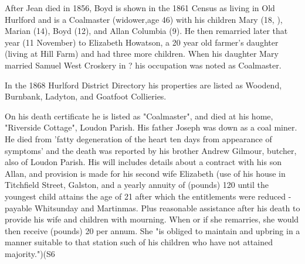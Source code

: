 After Jean died in 1856, Boyd is shown in the 1861 Census as living in Old Hurlford and is a Coalmaster (widower,age 46) with his children Mary (18, ), Marian (14), Boyd (12), and Allan Columbia (9). He then remarried later that year (11 November) to Elizabeth Howatson, a 20 year old farmer's daughter (living at Hill Farm) and had three more children.
When his daughter Mary married Samuel West Croskery in ? his occupation was noted as Coalmaster.

In the 1868 Hurlford District Directory his properties are listed as Woodend, Burnbank, Ladyton, and Goatfoot Collieries.

On his death certificate he is listed as "Coalmaster", and died at his home, "Riverside Cottage", Loudon Parish. His father Joseph was down as a coal miner. He died from 'fatty degeneration of the heart ten days from appearance of symptoms' and the death was reported by his brother Andrew Gilmour, butcher, also of Loudon Parish. His will includes details about a contract with his son Allan, and provision is made for his second wife Elizabeth (use of his house in Titchfield Street, Galston, and a yearly annuity of (pounds) 120 until the youngest child attains the age of 21 after which the entitlements were reduced - payable Whitsunday and Martinmas. Plus reasonable assistance after his death to provide his wife and children with mourning. When or if she remarries, she would then receive (pounds) 20 per annum. She "is obliged to maintain and upbring in a manner suitable to that station such of his children who have not attained majority.")(S6 

\begin{references}



\end{references}
